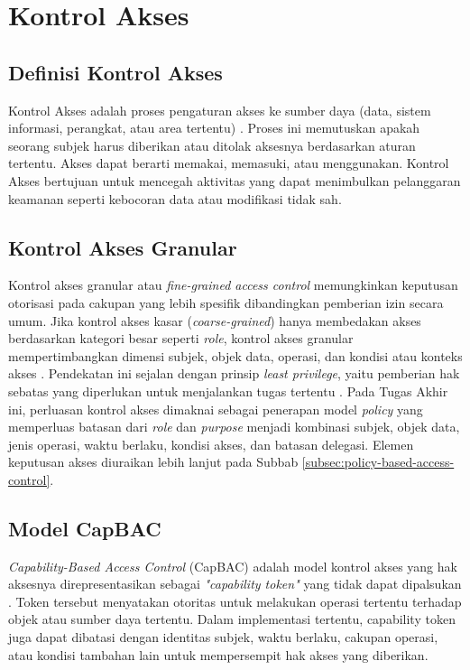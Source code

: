\section{Kontrol Akses}
\label{sec:kontrol-akses}

\subsection{Definisi Kontrol Akses}
\label{subsec:definisi-kontrol-akses}
Kontrol Akses adalah proses pengaturan akses ke sumber daya (data, sistem informasi, perangkat, atau area tertentu) \autocite{sandhu1994access, li2022capability}. Proses ini memutuskan apakah seorang subjek harus diberikan atau ditolak aksesnya berdasarkan aturan tertentu. Akses dapat berarti memakai, memasuki, atau menggunakan. Kontrol Akses bertujuan untuk mencegah aktivitas yang dapat menimbulkan pelanggaran keamanan seperti kebocoran data atau modifikasi tidak sah.

\subsection{Kontrol Akses Granular}
\label{subsec:kontrol-akses-granular}

Kontrol akses granular atau \textit{fine-grained access control} memungkinkan keputusan otorisasi pada cakupan yang lebih spesifik dibandingkan pemberian izin secara umum. Jika kontrol akses kasar (\textit{coarse-grained}) hanya membedakan akses berdasarkan kategori besar seperti \textit{role}, kontrol akses granular mempertimbangkan dimensi subjek, objek data, operasi, dan kondisi atau konteks akses \autocite{hu2014abac, odugu2021finegrained}. Pendekatan ini sejalan dengan prinsip \textit{least privilege}, yaitu pemberian hak sebatas yang diperlukan untuk menjalankan tugas tertentu \autocite{nist80053r5}. Pada Tugas Akhir ini, perluasan kontrol akses dimaknai sebagai penerapan model \textit{policy} yang memperluas batasan dari \textit{role} dan \textit{purpose} menjadi kombinasi subjek, objek data, jenis operasi, waktu berlaku, kondisi akses, dan batasan delegasi. Elemen keputusan akses diuraikan lebih lanjut pada Subbab \ref{subsec:policy-based-access-control}.

\subsection{Model CapBAC}
\label{subsec:model-capbac}

\textit{Capability-Based Access Control} (CapBAC) adalah model kontrol akses yang hak aksesnya direpresentasikan sebagai \textit{"capability token"} yang tidak dapat dipalsukan \autocite{li2022capability, anagnostopoulou2025bolstering}. Token tersebut menyatakan otoritas untuk melakukan operasi tertentu terhadap objek atau sumber daya tertentu. Dalam implementasi tertentu, capability token juga dapat dibatasi dengan identitas subjek, waktu berlaku, cakupan operasi, atau kondisi tambahan lain untuk mempersempit hak akses yang diberikan.

